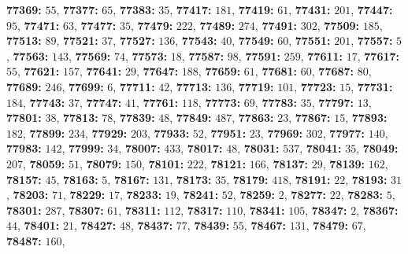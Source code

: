 \textsf{\bfseries 77369:} $55$, \textsf{\bfseries 77377:} $65$, \textsf{\bfseries 77383:} $35$, \textsf{\bfseries 77417:} $181$, \textsf{\bfseries 77419:} $61$, \textsf{\bfseries 77431:} $201$, \textsf{\bfseries 77447:} $95$, \textsf{\bfseries 77471:} $63$, \textsf{\bfseries 77477:} $35$, \textsf{\bfseries 77479:} $222$, \textsf{\bfseries 77489:} $274$, \textsf{\bfseries 77491:} $302$, \textsf{\bfseries 77509:} $185$, \textsf{\bfseries 77513:} $89$, \textsf{\bfseries 77521:} $37$, \textsf{\bfseries 77527:} $136$, \textsf{\bfseries 77543:} $40$, \textsf{\bfseries 77549:} $60$, \textsf{\bfseries 77551:} $201$, \textsf{\bfseries 77557:} $5$, \textsf{\bfseries 77563:} $143$, \textsf{\bfseries 77569:} $74$, \textsf{\bfseries 77573:} $18$, \textsf{\bfseries 77587:} $98$, \textsf{\bfseries 77591:} $259$, \textsf{\bfseries 77611:} $17$, \textsf{\bfseries 77617:} $55$, \textsf{\bfseries 77621:} $157$, \textsf{\bfseries 77641:} $29$, \textsf{\bfseries 77647:} $188$, \textsf{\bfseries 77659:} $61$, \textsf{\bfseries 77681:} $60$, \textsf{\bfseries 77687:} $80$, \textsf{\bfseries 77689:} $246$, \textsf{\bfseries 77699:} $6$, \textsf{\bfseries 77711:} $42$, \textsf{\bfseries 77713:} $136$, \textsf{\bfseries 77719:} $101$, \textsf{\bfseries 77723:} $15$, \textsf{\bfseries 77731:} $184$, \textsf{\bfseries 77743:} $37$, \textsf{\bfseries 77747:} $41$, \textsf{\bfseries 77761:} $118$, \textsf{\bfseries 77773:} $69$, \textsf{\bfseries 77783:} $35$, \textsf{\bfseries 77797:} $13$, \textsf{\bfseries 77801:} $38$, \textsf{\bfseries 77813:} $78$, \textsf{\bfseries 77839:} $48$, \textsf{\bfseries 77849:} $487$, \textsf{\bfseries 77863:} $23$, \textsf{\bfseries 77867:} $15$, \textsf{\bfseries 77893:} $182$, \textsf{\bfseries 77899:} $234$, \textsf{\bfseries 77929:} $203$, \textsf{\bfseries 77933:} $52$, \textsf{\bfseries 77951:} $23$, \textsf{\bfseries 77969:} $302$, \textsf{\bfseries 77977:} $140$, \textsf{\bfseries 77983:} $142$, \textsf{\bfseries 77999:} $34$, \textsf{\bfseries 78007:} $433$, \textsf{\bfseries 78017:} $48$, \textsf{\bfseries 78031:} $537$, \textsf{\bfseries 78041:} $35$, \textsf{\bfseries 78049:} $207$, \textsf{\bfseries 78059:} $51$, \textsf{\bfseries 78079:} $150$, \textsf{\bfseries 78101:} $222$, \textsf{\bfseries 78121:} $166$, \textsf{\bfseries 78137:} $29$, \textsf{\bfseries 78139:} $162$, \textsf{\bfseries 78157:} $45$, \textsf{\bfseries 78163:} $5$, \textsf{\bfseries 78167:} $131$, \textsf{\bfseries 78173:} $35$, \textsf{\bfseries 78179:} $418$, \textsf{\bfseries 78191:} $22$, \textsf{\bfseries 78193:} $31$, \textsf{\bfseries 78203:} $71$, \textsf{\bfseries 78229:} $17$, \textsf{\bfseries 78233:} $19$, \textsf{\bfseries 78241:} $52$, \textsf{\bfseries 78259:} $2$, \textsf{\bfseries 78277:} $22$, \textsf{\bfseries 78283:} $5$, \textsf{\bfseries 78301:} $287$, \textsf{\bfseries 78307:} $61$, \textsf{\bfseries 78311:} $112$, \textsf{\bfseries 78317:} $110$, \textsf{\bfseries 78341:} $105$, \textsf{\bfseries 78347:} $2$, \textsf{\bfseries 78367:} $44$, \textsf{\bfseries 78401:} $21$, \textsf{\bfseries 78427:} $48$, \textsf{\bfseries 78437:} $77$, \textsf{\bfseries 78439:} $55$, \textsf{\bfseries 78467:} $131$, \textsf{\bfseries 78479:} $67$, \textsf{\bfseries 78487:} $160$, 

